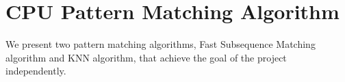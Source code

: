 \section{CPU Pattern Matching Algorithm}
\label{sec:algorithms}

We present two pattern matching algorithms, Fast Subsequence Matching algorithm and KNN algorithm, that achieve the goal of the project independently.



